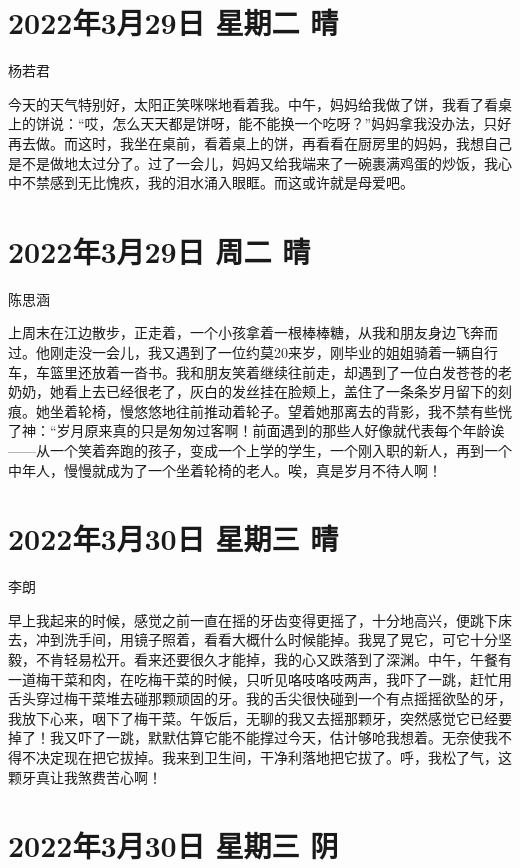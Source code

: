 \section{2022年3月29日 星期二 晴}

杨若君

今天的天气特别好，太阳正笑咪咪地看着我。中午，妈妈给我做了饼，我看了看桌上的饼说：“哎，怎么天天都是饼呀，能不能换一个吃呀？”妈妈拿我没办法，只好再去做。而这时，我坐在桌前，看着桌上的饼，再看看在厨房里的妈妈，我想自己是不是做地太过分了。过了一会儿，妈妈又给我端来了一碗裹满鸡蛋的炒饭，我心中不禁感到无比愧疚，我的泪水涌入眼眶。而这或许就是母爱吧。

\section{2022年3月29日 周二 晴}

陈思涵

上周末在江边散步，正走着，一个小孩拿着一根棒棒糖，从我和朋友身边飞奔而过。他刚走没一会儿，我又遇到了一位约莫20来岁，刚毕业的姐姐骑着一辆自行车，车篮里还放着一沓书。我和朋友笑着继续往前走，却遇到了一位白发苍苍的老奶奶，她看上去已经很老了，灰白的发丝挂在脸颊上，盖住了一条条岁月留下的刻痕。她坐着轮椅，慢悠悠地往前推动着轮子。望着她那离去的背影，我不禁有些恍了神：“岁月原来真的只是匆匆过客啊！前面遇到的那些人好像就代表每个年龄诶——从一个笑着奔跑的孩子，变成一个上学的学生，一个刚入职的新人，再到一个中年人，慢慢就成为了一个坐着轮椅的老人。唉，真是岁月不待人啊！

\section{2022年3月30日 星期三 晴}

李朗

早上我起来的时候，感觉之前一直在摇的牙齿变得更摇了，十分地高兴，便跳下床去，冲到洗手间，用镜子照着，看看大概什么时候能掉。我晃了晃它，可它十分坚毅，不肯轻易松开。看来还要很久才能掉，我的心又跌落到了深渊。中午，午餐有一道梅干菜和肉，在吃梅干菜的时候，只听见咯吱咯吱两声，我吓了一跳，赶忙用舌头穿过梅干菜堆去碰那颗顽固的牙。我的舌尖很快碰到一个有点摇摇欲坠的牙，我放下心来，咽下了梅干菜。午饭后，无聊的我又去摇那颗牙，突然感觉它已经要掉了！我又吓了一跳，默默估算它能不能撑过今天，估计够呛我想着。无奈使我不得不决定现在把它拔掉。我来到卫生间，干净利落地把它拔了。呼，我松了气，这颗牙真让我煞费苦心啊！

\section{2022年3月30日 星期三 阴}

